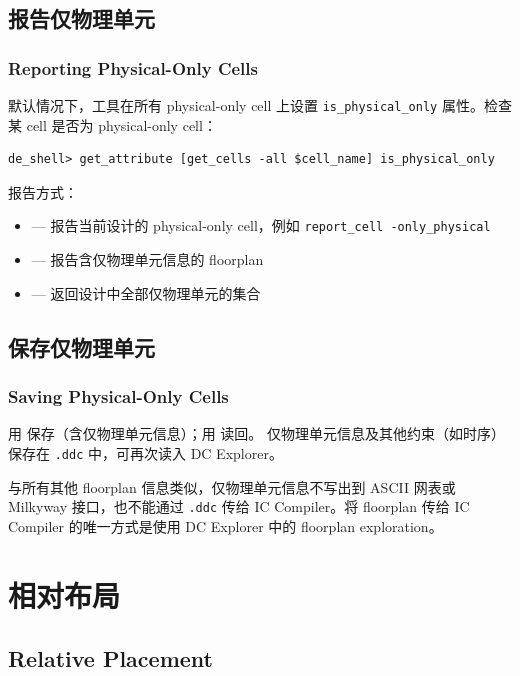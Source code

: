 \subsection{报告仅物理单元}
\subsubsection*{Reporting Physical-Only Cells}

默认情况下，工具在所有 physical-only cell 上设置 \texttt{is\_physical\_only} 属性。检查某 cell 是否为 physical-only cell：
\begin{lstlisting}
de_shell> get_attribute [get_cells -all $cell_name] is_physical_only
\end{lstlisting}

报告方式：
\begin{itemize}
  \item {} — 报告当前设计的 physical-only cell，例如 \texttt{report\_cell -only\_physical}
  \item {} — 报告含仅物理单元信息的 floorplan
  \item {} — 返回设计中全部仅物理单元的集合
\end{itemize}

\subsection{保存仅物理单元}
\subsubsection*{Saving Physical-Only Cells}

用  保存（含仅物理单元信息）；用  读回。
仅物理单元信息及其他约束（如时序）保存在 \texttt{.ddc} 中，可再次读入 DC Explorer。

\begin{noteBox}
与所有其他 floorplan 信息类似，仅物理单元信息不写出到 ASCII 网表或 Milkyway 接口，也不能通过 \texttt{.ddc} 传给 IC Compiler。将 floorplan 传给 IC Compiler 的唯一方式是使用 DC Explorer 中的 floorplan exploration。
\end{noteBox}

\section{相对布局}
\subsection*{Relative Placement}

